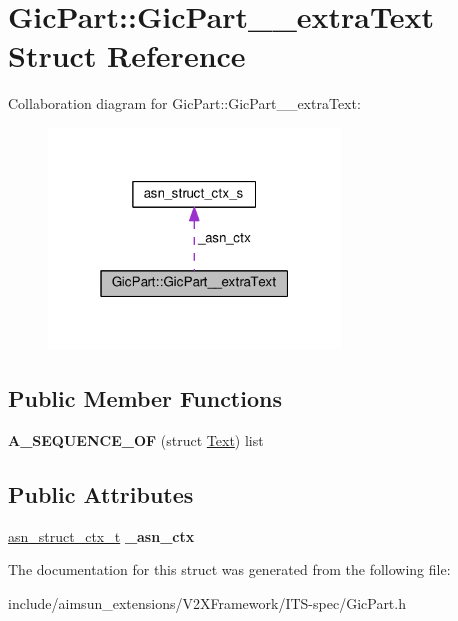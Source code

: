 \hypertarget{structGicPart_1_1GicPart____extraText}{}\section{Gic\+Part\+:\+:Gic\+Part\+\_\+\+\_\+extra\+Text Struct Reference}
\label{structGicPart_1_1GicPart____extraText}


Collaboration diagram for Gic\+Part\+:\+:Gic\+Part\+\_\+\+\_\+extra\+Text\+:\nopagebreak
\begin{figure}[H]
\begin{center}
\leavevmode
\includegraphics[width=220pt]{structGicPart_1_1GicPart____extraText__coll__graph}
\end{center}
\end{figure}
\subsection*{Public Member Functions}
\begin{DoxyCompactItemize}
\item 
{\bfseries A\+\_\+\+S\+E\+Q\+U\+E\+N\+C\+E\+\_\+\+OF} (struct \hyperlink{structText}{Text}) list\hypertarget{structGicPart_1_1GicPart____extraText_a16d86db5caade0038b9fd873e56a2bc2}{}\label{structGicPart_1_1GicPart____extraText_a16d86db5caade0038b9fd873e56a2bc2}

\end{DoxyCompactItemize}
\subsection*{Public Attributes}
\begin{DoxyCompactItemize}
\item 
\hyperlink{structasn__struct__ctx__s}{asn\+\_\+struct\+\_\+ctx\+\_\+t} {\bfseries \+\_\+asn\+\_\+ctx}\hypertarget{structGicPart_1_1GicPart____extraText_a8d06e2dfc324439413c4983d0e65e150}{}\label{structGicPart_1_1GicPart____extraText_a8d06e2dfc324439413c4983d0e65e150}

\end{DoxyCompactItemize}


The documentation for this struct was generated from the following file\+:\begin{DoxyCompactItemize}
\item 
include/aimsun\+\_\+extensions/\+V2\+X\+Framework/\+I\+T\+S-\/spec/Gic\+Part.\+h\end{DoxyCompactItemize}
